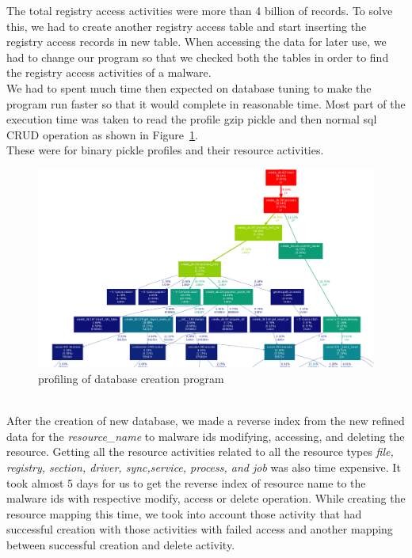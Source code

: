 The total registry access activities were more than 4 billion of records.
To solve this, we had to create another registry access table and start inserting the registry access records in new table.
When accessing the data for later use, we had to change our program so that we checked both the tables in order to find the registry access activities of a malware.\\
We had to spent much time then expected on database tuning to make the program run faster so that it would complete in reasonable time.
Most part of the execution time was taken to read the profile gzip pickle and then normal sql CRUD operation as shown in Figure~\ref{fig:dbcreation}.\\
These were for \gettotalmalwareii{} binary pickle profiles and their resource activities.
\begin{figure}
\begin{center}
  \includegraphics[scale=0.27]{figures/db_creation.png}
\end{center}
\caption{profiling of database creation program}
\label{fig:dbcreation}
\end{figure}
\\
After the creation of new database, we made a reverse index from the new refined data for the \emph{resource\_name} to malware ids modifying, accessing, and deleting the resource.
Getting all the resource activities related to all the resource types \emph{file, registry, section, driver, sync,service, process, and job} was also time expensive.
It took almost 5 days for us to get the reverse index of resource name to the malware ids with respective modify, access or delete operation.
While creating the resource mapping this time, we took into account those activity that had successful creation with those activities with failed access and another mapping between successful creation and delete activity.
